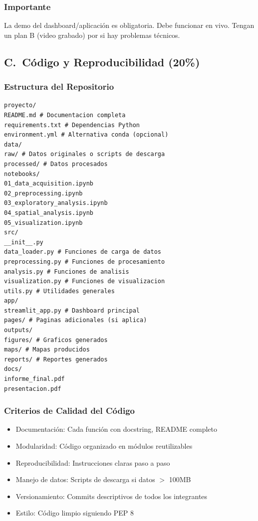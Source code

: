 \documentclass[11pt,a4paper]{article}
\begin{document}
\subsubsection*{Importante}
La demo del dashboard/aplicación es obligatoria. Debe funcionar en vivo. Tengan un plan
B (video grabado) por si hay problemas técnicos.

\subsection{C.\ Código y Reproducibilidad (20\%)}
\subsubsection{Estructura del Repositorio}
\begin{lstlisting}[basicstyle=\ttfamily\small]
proyecto/
README.md # Documentacion completa
requirements.txt # Dependencias Python
environment.yml # Alternativa conda (opcional)
data/
raw/ # Datos originales o scripts de descarga
processed/ # Datos procesados
notebooks/
01_data_acquisition.ipynb
02_preprocessing.ipynb
03_exploratory_analysis.ipynb
04_spatial_analysis.ipynb
05_visualization.ipynb
src/
__init__.py
data_loader.py # Funciones de carga de datos
preprocessing.py # Funciones de procesamiento
analysis.py # Funciones de analisis
visualization.py # Funciones de visualizacion
utils.py # Utilidades generales
app/
streamlit_app.py # Dashboard principal
pages/ # Paginas adicionales (si aplica)
outputs/
figures/ # Graficos generados
maps/ # Mapas producidos
reports/ # Reportes generados
docs/
informe_final.pdf
presentacion.pdf
\end{lstlisting}

\subsubsection{Criterios de Calidad del Código}
\begin{itemize}[leftmargin=*]
\item Documentación: Cada función con docstring, README completo
\item Modularidad: Código organizado en módulos reutilizables
\item Reproducibilidad: Instrucciones claras paso a paso
\item Manejo de datos: Scripts de descarga si datos $>$ 100MB
\item Versionamiento: Commits descriptivos de todos los integrantes
\item Estilo: Código limpio siguiendo PEP 8
\end{itemize}
\end{document}
